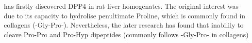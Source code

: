 \citet{Hopsu-Havu1966} has firstly discovered DPP4 in rat liver homogenates. The original interest was due to its capacity to hydrolise penultimate Proline, which is commonly found in collagens (-Gly-Pro-). Nevertheless, the later research has found that inabilily to cleave Pro-Pro and Pro-Hyp dipeptides (commonly follows -Gly-Pro- in collagens) 